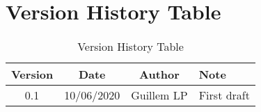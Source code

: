 \section{Version History Table}

\begin{table}[h]
	\centering
	\begin{tabular}{|c|c|c|l|}
		\hline
		Version & Date       & Author     & Note                                \\ \hline
		0.1     & 10/06/2020 & Guillem LP & First draft                         \\ \hline
	\end{tabular}
	\caption{Version History Table}
	\label{tab:version-table}
\end{table}